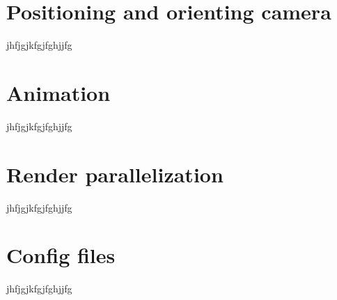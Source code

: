 \documentclass[12pt]{report}
\begin{document}
\chapter{Positioning and orienting camera}
jhfjgjkfgjfghjjfg

\chapter{Animation}
jhfjgjkfgjfghjjfg

\chapter{Render parallelization}
jhfjgjkfgjfghjjfg

\chapter{Config files}
jhfjgjkfgjfghjjfg
\end{document}
